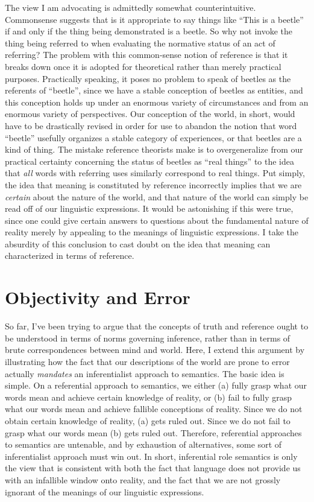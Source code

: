 The view I am advocating is admittedly somewhat counterintuitive. Commonsense suggests that is it appropriate to say things like ``This is a beetle'' if and only if the thing being demonstrated is a beetle. So why not invoke the thing being referred to when evaluating the normative status of an act of referring? The problem with this common-sense notion of reference is that it breaks down once it is adopted for theoretical rather than merely practical purposes. Practically speaking, it poses no problem to speak of beetles as the referents of ``beetle'', since we have a stable conception of beetles as entities, and this conception holds up under an enormous variety of circumstances and from an enormous variety of perspectives. Our conception of the world, in short, would have to be drastically revised in order for use to abandon the notion that word ``beetle'' usefully organizes a stable category of experiences, or that beetles are a kind of thing. The mistake reference theorists make is to overgeneralize from our practical certainty concerning the status of beetles as ``real things'' to the idea that \textit{all} words with referring uses similarly correspond to real things. Put simply, the idea that meaning is constituted by reference incorrectly implies that we are \textit{certain} about the nature of the world, and that nature of the world can simply be read off of our linguistic expressions. It would be astonishing if this were true, since one could give certain answers to questions about the fundamental nature of reality merely by appealing to the meanings of linguistic expressions. I take the absurdity of this conclusion to cast doubt on the idea that meaning can characterized in terms of reference. 

\section{Objectivity and Error}

So far, I've been trying to argue that the concepts of truth and reference ought to be understood in terms of norms governing inference, rather than in terms of brute correspondences between mind and world. Here, I extend this argument by illustrating how the fact that our descriptions of the world are prone to error actually \textit{mandates} an inferentialist approach to semantics. The basic idea is simple. On a referential approach to semantics, we either (a) fully grasp what our words mean and achieve certain knowledge of reality, or (b) fail to fully grasp what our words mean and achieve fallible conceptions of reality. Since we do not obtain certain knowledge of reality, (a) gets ruled out. Since we do not fail to grasp what our words mean (b) gets ruled out. Therefore, referential approaches to semantics are untenable, and by exhaustion of alternatives, some sort of inferentialist approach must win out. In short, inferential role semantics is only the view that is consistent with both the fact that language does not provide us with an infallible window onto reality, and the fact that we are not grossly ignorant of the meanings of our linguistic expressions. 

